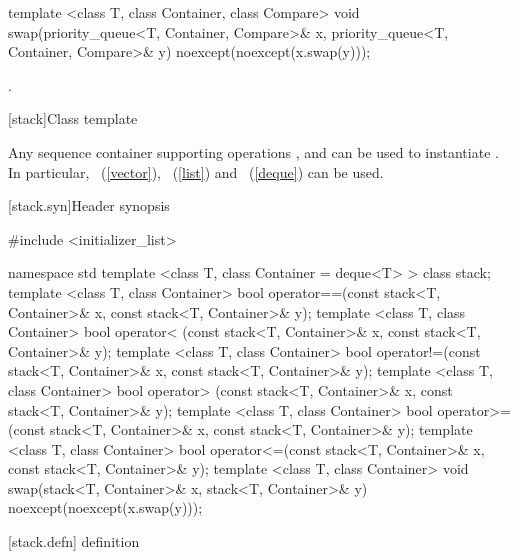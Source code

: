 %
%
\begin{itemdecl}
template <class T, class Container, class Compare>
  void swap(priority_queue<T, Container, Compare>& x,
            priority_queue<T, Container, Compare>& y) noexcept(noexcept(x.swap(y)));
\end{itemdecl}

\begin{itemdescr}
\pnum
\effects {}.
\end{itemdescr}

[stack]{Class template }

\pnum
{}%
Any sequence container supporting operations
,
and
can be used to instantiate
.
In particular,
~(\ref{vector}),
~(\ref{list})
and
~(\ref{deque})
can be used.

[stack.syn]{Header  synopsis}%

\begin{codeblock}
#include <initializer_list>

namespace std {
  template <class T, class Container = deque<T> > class stack;
  template <class T, class Container>
    bool operator==(const stack<T, Container>& x, const stack<T, Container>& y);
  template <class T, class Container>
    bool operator< (const stack<T, Container>& x, const stack<T, Container>& y);
  template <class T, class Container>
    bool operator!=(const stack<T, Container>& x, const stack<T, Container>& y);
  template <class T, class Container>
    bool operator> (const stack<T, Container>& x, const stack<T, Container>& y);
  template <class T, class Container>
    bool operator>=(const stack<T, Container>& x, const stack<T, Container>& y);
  template <class T, class Container>
    bool operator<=(const stack<T, Container>& x, const stack<T, Container>& y);
  template <class T, class Container>
    void swap(stack<T, Container>& x, stack<T, Container>& y) noexcept(noexcept(x.swap(y)));
}
\end{codeblock}

[stack.defn]{ definition}

